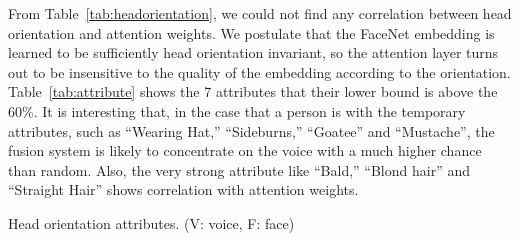\documentclass{article}
\begin{document}
From Table~\ref{tab:headorientation}, we could not find any correlation between head orientation and attention weights. We postulate that the FaceNet embedding is learned to be sufficiently head orientation invariant, so the attention layer turns out to be insensitive to the quality of the embedding according to the orientation. Table~\ref{tab:attribute} shows the 7 attributes that their lower bound is above the 60\%. It is interesting that, in the case that a person is with the temporary attributes, such as ``Wearing Hat,'' ``Sideburns,'' ``Goatee'' and ``Mustache'', the fusion system is likely to concentrate on the voice with a much higher chance than random. 
Also, the very strong attribute like ``Bald,'' ``Blond hair'' and ``Straight Hair'' shows correlation with attention weights.
\centering
\begin{subtable}[ht]{1\linewidth}
\centering
{}
\caption{Head orientation attributes. (V: voice, F: face)}
\label{tab:headorientation}
\end{subtable}
\vspace{5pt}
\end{document}
